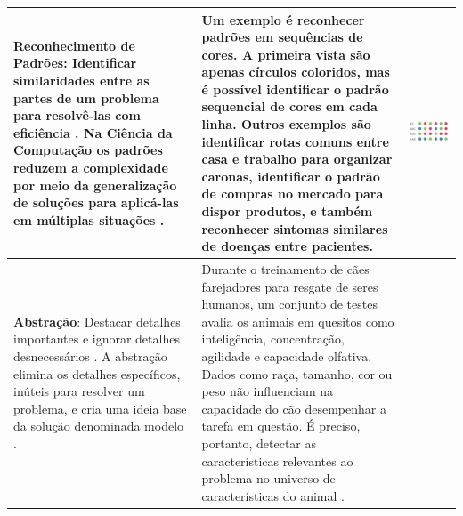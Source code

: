 \begin{landscape}
\begin{quadro}[!htbp]
\begin{center}
\begin{footnotesize}
\begin{tabular}{|p{6cm}|p{9cm}|p{5cm}|}
            \textbf{Reconhecimento de Padrões}: Identificar similaridades entre as partes de um problema para resolvê-las com eficiência \cite{bbc_learning_what_2015}. Na Ciência da Computação os padrões reduzem a complexidade por meio da generalização de soluções para aplicá-las em múltiplas situações \cite{k-12_computer_science_framework_k12_2016}. 
            &
            Um exemplo é reconhecer padrões em sequências de cores. A primeira vista são apenas círculos coloridos, mas é possível identificar o padrão sequencial de cores em cada linha. Outros exemplos são identificar rotas comuns entre casa e trabalho para organizar caronas, identificar o padrão de compras no mercado para dispor produtos, e também reconhecer sintomas similares de doenças entre pacientes.
            &
            \begin{center}
                \includegraphics[width=1\linewidth]{figs/pattern_recognition.png}    
            \end{center}
            \\ \hline
            \textbf{Abstração}: Destacar detalhes importantes e ignorar detalhes desnecessários \cite{wing_computational_2008}. A abstração elimina os detalhes específicos, inúteis para resolver um problema, e cria uma ideia base da solução denominada modelo \cite{bbc_learning_what_2015}.
            &
            Durante o treinamento de cães farejadores para resgate de seres humanos, um conjunto de testes avalia os animais em quesitos como inteligência, concentração, agilidade e capacidade olfativa. Dados como raça, tamanho, cor ou peso não influenciam na capacidade do cão desempenhar a tarefa em questão. É preciso, portanto, detectar as características relevantes ao problema no universo de características do animal \cite{davidson_12_2018}.
            &
            \begin{center}

\end{center}
\end{tabular}
\end{footnotesize}
\end{center}
\end{quadro}
\end{landscape}

